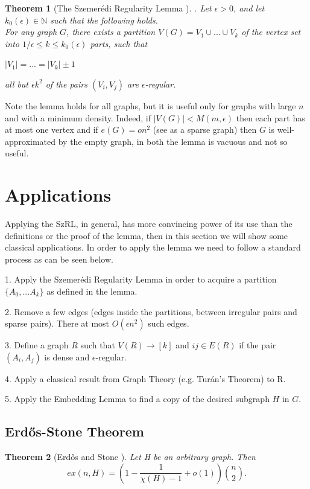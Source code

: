 \documentclass[12pt,twoside,a4paper]{book}
\numberwithin{equation}{section}
\newtheorem{theorem}             {Theorem}[section]
\theoremstyle{remark}
\begin{document}
\begin{theorem}[{The Szemerédi Regularity Lemma \cite{Sz75}}]. Let $\epsilon > 0$, and let $k_0(\epsilon) \in  \mathbb{N}$ such that the following holds.\\
For any graph $G$, there exists a partition $V(G) = V_1 \cup ... \cup V_k$ of the vertex set into $1/ \epsilon \leq k \leq k_0 (\epsilon)$ parts, such that

$|V_1| = ... =|V_k| \pm 1$


all but $\epsilon k^2$ of the pairs $(V_i, V_j)$ are $\epsilon$-regular. 
\end{theorem}

Note the lemma holds for all graphs, but it is useful only for graphs with large $n$ and with a minimum density. Indeed, if $|V(G)| < M(m, \epsilon)$ then each part has at most one vertex and if $e(G) = on^2$ (see as a sparse graph) then $G$ is well-approximated by the empty graph, in both the lemma is vacuous and not so useful.  

\section{Applications}
Applying the SzRL, in general, has more convincing power of its use than the definitions or the proof of the lemma, then in this section we will show some classical applications. In order to apply the lemma we need to follow a standard process as can be seen below.

1. Apply the Szemerédi Regularity Lemma in order to acquire a partition $ \{ A_0, ... A_k \} $ as defined in the lemma.

2. Remove a few edges (edges inside the partitions, between irregular pairs and sparse pairs). There at most $O(\epsilon n^2)$ such edges.

3. Define a graph $R$ such that $V(R) \rightarrow [k]$ and $ij \in E(R) $ if  the pair $(A_i, A_j)$ is dense and $\epsilon$-regular.

4. Apply a classical result from Graph Theory (e.g. Turán's Theorem) to R.

5. Apply the Embedding Lemma to find a copy of the desired subgraph $H$ in $G$.
\subsection{Erd\H{o}s-Stone Theorem}

\begin{theorem}[{Erd\H{o}s and Stone \cite{ErSt46}}] Let H be an arbitrary graph. Then
$$ ex(n,H) = \left(1-\frac{1}{\chi (H)-1} + o(1)\right) \binom{n}{2}.$$ 
\end{theorem}
\end{document}
